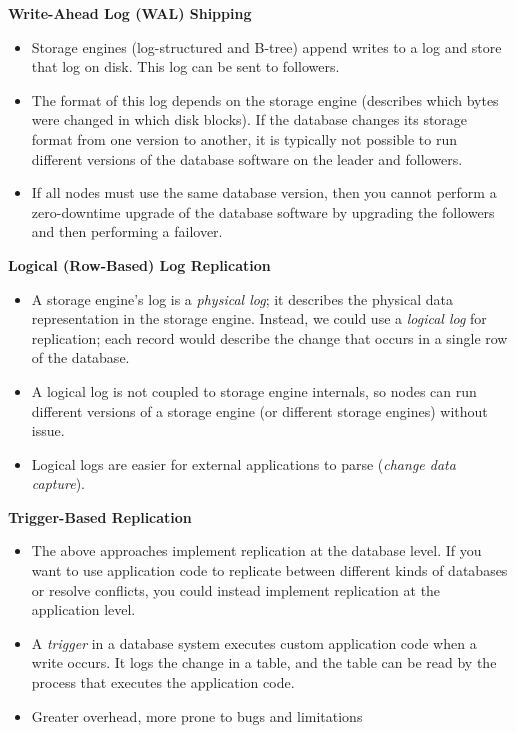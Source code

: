 \documentclass[12pt, titlepage]{article}
\newcommand{\subsubsubsection}[1]{\small \textbf{#1} \medskip}
\begin{document}
\subsubsubsection{Write-Ahead Log (WAL) Shipping}
\begin{itemize}
	\item Storage engines (log-structured and B-tree) append writes to a log and store that log on disk. This log can be sent to followers.
	\item The format of this log depends on the storage engine (describes which bytes were changed in which disk blocks). If the database changes its storage format from one version to another, it is typically not possible to run different versions of the database software on the leader and followers.
	\item If all nodes must use the same database version, then you cannot perform a zero-downtime upgrade of the database software by upgrading the followers and then performing a failover. \\
\end{itemize}

\subsubsubsection{Logical (Row-Based) Log Replication}
\begin{itemize}
	\item A storage engine's log is a \textit{physical log}; it describes the physical data representation in the storage engine. Instead, we could use a \textit{logical log} for replication; each record would describe the change that occurs in a single row of the database.
	\item A logical log is not coupled to storage engine internals, so nodes can run different versions of a storage engine (or different storage engines) without issue.
	\item Logical logs are easier for external applications to parse (\textit{change data capture}). \\
\end{itemize}

\subsubsubsection{Trigger-Based Replication}
\begin{itemize}
	\item The above approaches implement replication at the database level. If you want to use application code to replicate between different kinds of databases or resolve conflicts, you could instead implement replication at the application level.
	\item A \textit{trigger} in a database system executes custom application code when a write occurs. It logs the change in a table, and the table can be read by the process that executes the application code.
	\item Greater overhead, more prone to bugs and limitations
\end{itemize}
\end{document}
